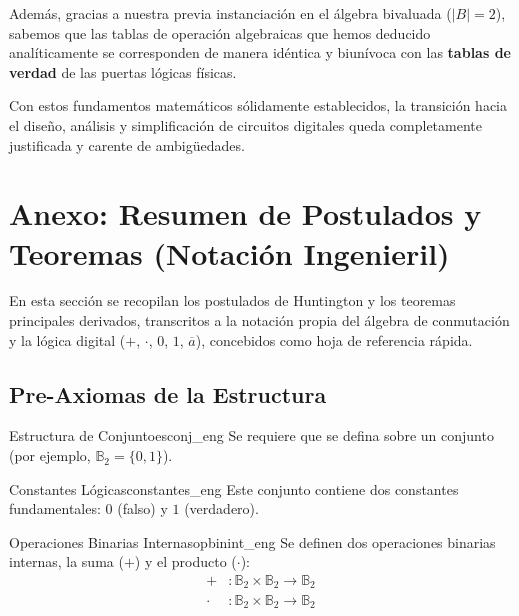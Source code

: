 Además, gracias a nuestra previa instanciación en el álgebra bivaluada ($|B|=2$), sabemos que las tablas de operación algebraicas que hemos deducido analíticamente se corresponden de manera idéntica y biunívoca con las \textbf{tablas de verdad} de las puertas lógicas físicas.

Con estos fundamentos matemáticos sólidamente establecidos, la transición hacia el diseño, análisis y simplificación de circuitos digitales queda completamente justificada y carente de ambigüedades.

\newpage
\section{Anexo: Resumen de Postulados y Teoremas (Notación Ingenieril)}
\makeatletter

En esta sección se recopilan los postulados de Huntington y los teoremas principales derivados, transcritos a la notación propia del álgebra de conmutación y la lógica digital ($+$, $\cdot$, $0$, $1$, $\overline{a}$), concebidos como hoja de referencia rápida.

\subsection*{Pre-Axiomas de la Estructura}

\setcounter{tcb@cnt@preaxioma}{0}
\begin{preaxioma}{Estructura de Conjunto}{esconj_eng}
Se requiere que se defina sobre un conjunto (por ejemplo, $\mathbb{B}_2 = \{0, 1\}$).
\end{preaxioma}

\setcounter{tcb@cnt@preaxioma}{1}
\begin{preaxioma}{Constantes Lógicas}{constantes_eng}
Este conjunto contiene dos constantes fundamentales: $0$ (falso) y $1$ (verdadero).
\end{preaxioma}

\setcounter{tcb@cnt@preaxioma}{2}
\begin{preaxioma}{Operaciones Binarias Internas}{opbinint_eng}
Se definen dos operaciones binarias internas, la suma ($+$) y el producto ($\cdot$):
\begin{align*}
+ &: \mathbb{B}_2 \times \mathbb{B}_2 \to \mathbb{B}_2 \\
\cdot &: \mathbb{B}_2 \times \mathbb{B}_2 \to \mathbb{B}_2
\end{align*}
\end{preaxioma}

